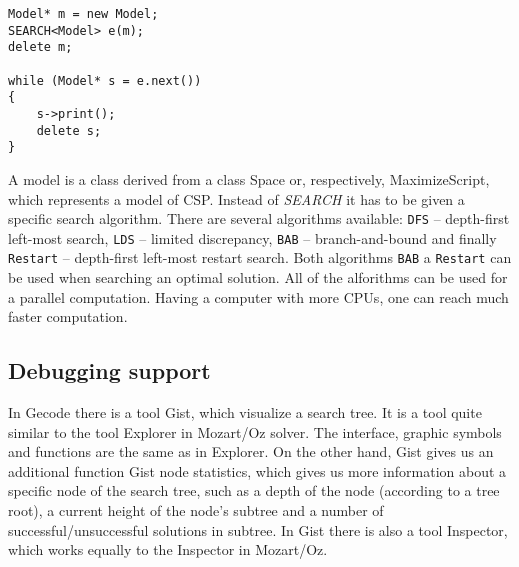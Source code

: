 \begin{verbatim}
Model* m = new Model;	
SEARCH<Model> e(m);
delete m;

while (Model* s = e.next())
{
	s->print();
	delete s;
}  
\end{verbatim}

A model is a class derived from a class Space or, respectively, MaximizeScript, which
represents a model of CSP. Instead of {\em SEARCH} it has to be given a specific search
algorithm. There are several algorithms available: \texttt{DFS} -- depth-first left-most search, \texttt{LDS} -- limited discrepancy,
\texttt{BAB} -- branch-and-bound and finally \texttt{Restart} -- depth-first left-most
restart search. Both algorithms \texttt{BAB} a \texttt{Restart} can be used when 
searching an optimal solution. All of the alforithms can be used for a parallel computation.
Having a computer with more CPUs, one can reach much faster computation.

\subsection{Debugging support}
In Gecode there is a tool Gist, which visualize a search tree. It is a tool quite 
similar to the tool Explorer in Mozart/Oz solver. The interface, graphic symbols and
functions are the same as in Explorer. On the other hand, Gist gives us an additional 
function Gist node statistics, which gives us more information about a specific node 
of the search tree, such as a depth of the node (according to a tree root), a current height
of the node's subtree and a number of successful/unsuccessful solutions in subtree.
In Gist there is also a tool Inspector, which works equally to the Inspector in Mozart/Oz.

